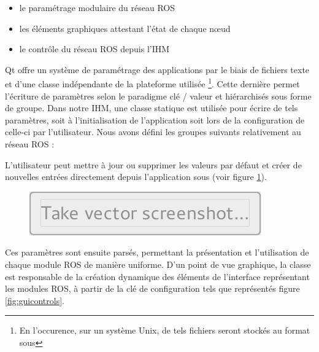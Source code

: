 \begin{itemize}
  \item le paramétrage modulaire du réseau ROS
  \item les éléments graphiques attestant l'état de chaque n\oe{}ud
  \item le contrôle du réseau ROS depuis l'IHM
\end{itemize}

Qt offre un système de paramétrage des applications par le biais de fichiers texte et d'une classe  indépendante de la plateforme utilisée
\footnote{En l'occurence, sur un système Unix, de tels fichiers seront stockés au format  sous }.
Cette dernière permet l'écriture de paramètres selon le paradigme clé / valeur et hiérarchisés sous forme de groupe.  
Dans notre IHM, une classe statique  est utilisée pour écrire de tels paramètres, soit à l'initialisation de l'application soit lors de la configuration de celle-ci par l'utilisateur. 
Nous avons défini les groupes suivants relativement au réseau ROS :

\renewcommand*\DTstylecomment{\rmfamily\color{red}}

L'utilisateur peut mettre à jour ou supprimer les valeurs par défaut et créer de nouvelles entrées directement depuis l'application sous  (voir figure \ref{fig:settings}).

\begin{figure}[h]
  \centering
    \includegraphics[width=.7\linewidth]{figures/settings}  
  \label{fig:settings}
\end{figure}

Ces paramètres sont ensuite parsés, permettant la présentation et l'utilisation de chaque module ROS de manière uniforme.
D'un point de vue graphique, la classe  est responsable de la création dynamique des éléments de l'interface représentant les modules ROS, à partir de la clé de configuration  
tels que représentés figure \ref{fig:guicontrols}.

